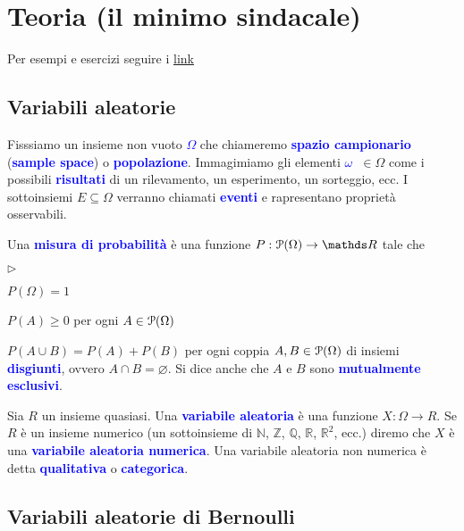 \documentclass[10pt,openany]{book}
\def\RR{\mathds R}
\def\ZZ{\mathds Z}
\def\NN{\mathds N}
\def\QQ{\mathds Q}
\def\P{\EuScript P}
\def\0{\varnothing}
\newcommand{\mylabel}[1]{{\footnotesize\textsf{#1}}\hfill}
\renewenvironment{itemize}
  {\begin{list}{$\triangleright$}{%
   \setlength{\parskip}{0mm}
   \setlength{\topsep}{.2\baselineskip}
   \setlength{\rightmargin}{0mm}
   \setlength{\listparindent}{0mm}
   \setlength{\itemindent}{0mm}
   \setlength{\labelwidth}{3ex}
   \setlength{\itemsep}{.4\baselineskip}
   \setlength{\parsep}{0mm}
   \setlength{\partopsep}{0mm}
   \setlength{\labelsep}{1ex}
   \setlength{\leftmargin}{\labelwidth+\labelsep}
   \let\makelabel\mylabel}}{%
   \end{list}\vspace*{-1.3mm}}
\def\emph#1{\textcolor{blue}{\textbf{\boldmath #1}}}
\theoremstyle{mio}
\theoremstyle{liscio}
\begin{document}
\setlength{\abovedisplayskip}{-1ex}
\setlength{\belowdisplayskip}{0pt}




\chapter{Teoria (il minimo sindacale)}
\raggedbottom

Per esempi e esercizi seguire i \hyperref[ch2]{link \faShare}


\clearpage\section{Variabili aleatorie}


\def\medrel#1{\parbox[t]{6ex}{$\displaystyle\hfil #1$}}
\def\ceq#1#2#3{\parbox{25ex}{$\displaystyle #1$}\medrel{#2}$\displaystyle  #3$}


Fisssiamo un insieme non vuoto \emph{$\Omega$\/} che chiameremo \emph{spazio campionario\/}  (\emph{sample space\/}) o \emph{popolazione}. Immagimiamo gli elementi \emph{$\omega$\ }$\in\Omega$ come i possibili \emph{risultati\/} di un rilevamento, un esperimento, un sorteggio, ecc. I sottoinsiemi $E\subseteq\Omega$ verranno chiamati \emph{eventi\/} e rapresentano proprietà osservabili.

Una \emph{misura di probabilità\/} è una funzione $P:\P(\Omega)\to\RR$ tale che 

\begin{itemize}
\item $P(\Omega)=1$
\item $P(A)\ge0$ per ogni $A\in\P(\Omega)$
\item $P(A\cup B)=P(A)+P(B)$ per ogni coppia $A,B\in\P(\Omega)$ di insiemi \emph{disgiunti}, ovvero $A\cap B=\0$. Si dice anche che $A$ e $B$ sono \emph{mutualmente esclusivi}.
\end{itemize}

Sia $R$ un insieme quasiasi. Una \emph{variabile aleatoria\/} è una funzione $X:\Omega\to R$. Se $R$ è un insieme numerico (un sottoinsieme di $\NN$, $\ZZ$, $\QQ$, $\RR$, $\RR^2$, ecc.) diremo che $X$ è una \emph{variabile aleatoria numerica}. Una variabile aleatoria non numerica è detta \emph{qualitativa\/} o \emph{categorica}.


\clearpage\section{Variabili aleatorie di Bernoulli}
\end{document}
